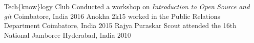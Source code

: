 \begin{cvhonors}
  \cvhonor
    {Tech\{know\}logy Club}
    {Conducted a workshop on \textit{Introduction to Open Source and git}}
    {Coimbatore, India}
    {2016}
  \cvhonor
    {Anokha 2k15}
    {worked in the Public Relations Department}
    {Coimbatore, India}
    {2015}
  \cvhonor
    {Rajya Puraskar Scout}
    {attended the 16th National Jamboree}
    {Hyderabad, India}
    {2010}
\end{cvhonors}